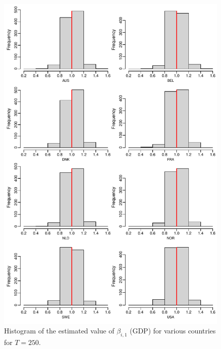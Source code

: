 \documentclass[a4paper,12pt]{article}
\begin{document}
\begin{enumerate}[label=\arabic*.,leftmargin=0.6cm]
{\begin{itemize}[topsep=0pt]
\begin{figure}[p!]
\begin{minipage}[t]{0.48\textwidth}
\includegraphics[width=\textwidth]{output/beta_GDP_T_250}
\caption{Histogram of the estimated value of $\beta_{i, 1}$ (GDP) for various countries for $T = 250$.}\label{fig:para:gdp:250}
\end{minipage}
\end{figure}



\end{itemize}}
\end{enumerate}
\end{document}
